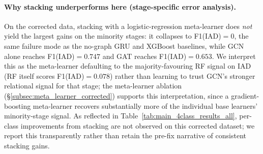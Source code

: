 \documentclass[pdflatex,sn-mathphys-num]{sn-jnl}
\theoremstyle{thmstyleone}%
\theoremstyle{thmstyletwo}%
\theoremstyle{thmstylethree}%
\begin{document}
\paragraph{Why stacking underperforms here (stage-specific error analysis).}
On the corrected data, stacking with a logistic-regression meta-learner does \emph{not} yield the largest gains on the minority stages: it collapses to F1(IAD)$=0$, the same failure mode as the no-graph GRU and XGBoost baselines, while GCN alone reaches F1(IAD)$=0.747$ and GAT reaches F1(IAD)$=0.653$. We interpret this as the meta-learner defaulting to the majority-favouring RF signal on IAD (RF itself scores F1(IAD)$=0.078$) rather than learning to trust GCN's stronger relational signal for that stage; the meta-learner ablation (\S\ref{subsec:meta_learner_corrected}) supports this interpretation, since a gradient-boosting meta-learner recovers substantially more of the individual base learners' minority-stage signal. As reflected in Table~\ref{tab:main_4class_results_all}, per-class improvements from stacking are not observed on this corrected dataset; we report this transparently rather than retain the pre-fix narrative of consistent stacking gains.
\end{document}
